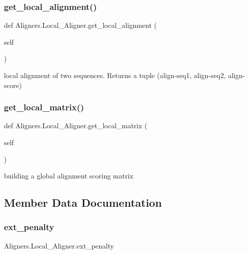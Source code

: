 \subsubsection{\texorpdfstring{get\+\_\+local\+\_\+alignment()}{get\_local\_alignment()}}
{\footnotesize\ttfamily def Aligners.\+Local\+\_\+\+Aligner.\+get\+\_\+local\+\_\+alignment (\begin{DoxyParamCaption}\item[{}]{self }\end{DoxyParamCaption})}

\begin{DoxyVerb}local alignment of two sequences. Returns a tuple
(align-seq1, align-seq2, align-score)
\end{DoxyVerb}
 \mbox{\label{class_aligners_1_1_local___aligner_a2df499a9d5f9b3cbae94999687bc7a5d}} 
\subsubsection{\texorpdfstring{get\+\_\+local\+\_\+matrix()}{get\_local\_matrix()}}
{\footnotesize\ttfamily def Aligners.\+Local\+\_\+\+Aligner.\+get\+\_\+local\+\_\+matrix (\begin{DoxyParamCaption}\item[{}]{self }\end{DoxyParamCaption})}

\begin{DoxyVerb}building a global alignment scoring matrix\end{DoxyVerb}
 

\subsection{Member Data Documentation}
\mbox{\label{class_aligners_1_1_local___aligner_aa7d238d0b57edc861e02b0b39c8fb7f1}} 
\subsubsection{\texorpdfstring{ext\+\_\+penalty}{ext\_penalty}}
{\footnotesize\ttfamily Aligners.\+Local\+\_\+\+Aligner.\+ext\+\_\+penalty}

